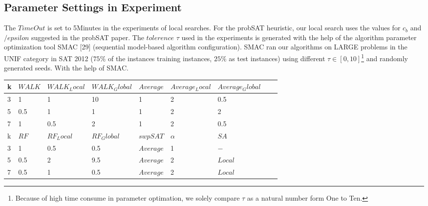 \documentclass[12pt,a4paper,twoside]{scrartcl}
\numberwithin{equation}{section}
\begin{document}
\subsection{Parameter Settings in Experiment}
The $TimeOut$ is set to 5Minutes in the experiments of local searches.  For the probSAT heuristic, our local search uses the values for $c_b$ and $/epsilon$ suggested in the probSAT paper.  The $tolerence$ $ \tau$ used in the experiments is generated with the help of the algorithm parameter optimization tool SMAC [29] (sequential model-based algorithm configuration). SMAC ran our algorithms on LARGE problems in the UNIF category in SAT 2012 ($75\%$ of the instances training instances,  $25\%$ as test instances) using different   $ \tau \in [0, 10]$\footnote{Because of high time consume in parameter optimation, we solely compare $\tau$  as a natural number form One to Ten.}  and randomly generated seeds. With the help of SMAC.
   \begin{table}[H]
\begin{center}
    \begin{tabular}{|l|l|l|l||l|l|l|l|p{1cm}|}
\hline 

    k &$WALK$&$WALK_Local$&$WALK_Global$&$Average$&$Average_Local$&$Average_Global$ \\ \hline
    3 & 1& 1 & 10 &  1 & 2& 0.5       \\ \hline  
    5 & 0.5& 1 & 1&  1 & 2& 2 \\ \hline  
    7 & 1& 0.5 & 2&  1 & 2& 0.5  \\ \hline  
 \hline  
    k &$RF$&$RF_Local$&$RF_Global$&$swpSAT$&$\alpha$&$SA$ \\ \hline  
    3 & 1& 0.5 & 0.5&$Average$ & 1 & $-$\\ \hline 
    5 & 0.5& 2& 9.5&$Average$& 2 & $Local$\\ \hline 
    7 & 0.5& 1& 0.5 &$Average$&2 & $Local$\\ \hline 

	
\end{tabular}
\end{center}
\end{table}
\end{document}
